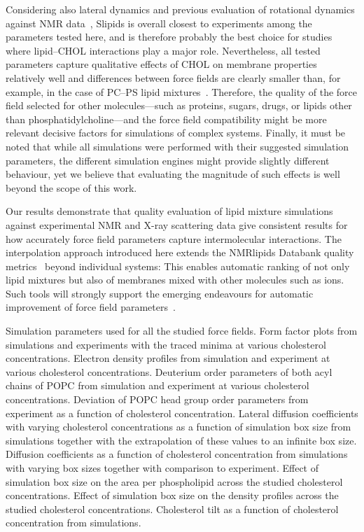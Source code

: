 \documentclass[journal=jctcce]{achemso}
\begin{document}
Considering also lateral dynamics and previous evaluation of rotational dynamics against NMR data~\cite{antila21using}, Slipids is overall closest to experiments among the parameters tested here, and is therefore probably the best choice for studies where lipid--CHOL interactions play a major role. Nevertheless, all tested parameters capture qualitative effects of CHOL on membrane properties relatively well and differences between force fields are clearly smaller than, for example, in the case of PC--PS lipid mixtures~\cite{antila2022emerging}. Therefore, the quality of the force field selected for other molecules---such as proteins, sugars, drugs, or lipids other than phosphatidylcholine---and the force field compatibility might be more relevant decisive factors for simulations of complex systems. Finally, it must be noted that while all simulations were performed with their suggested simulation parameters, the different simulation engines might provide slightly different behaviour, yet we believe that evaluating the magnitude of such effects is well beyond the scope of this work.

Our results demonstrate that quality evaluation of lipid mixture simulations against experimental NMR and X-ray scattering data give consistent results for how accurately force field parameters capture intermolecular interactions. The interpolation approach introduced here extends the NMRlipids Databank quality metrics~\cite{NMRlipidsDatabank} beyond individual systems: This enables automatic ranking of not only lipid mixtures but also of membranes mixed with other molecules such as ions. Such tools will strongly support the emerging endeavours for automatic improvement of force field parameters~\cite{antila2022emerging}.

\begin{suppinfo}
Simulation parameters used for all the studied force fields.
%
Form factor plots from simulations and experiments with the traced minima at various cholesterol concentrations.
%
Electron density profiles from simulation and experiment at various cholesterol concentrations.
%
Deuterium order parameters of both acyl chains of POPC from simulation and experiment at various cholesterol concentrations.
%
Deviation of POPC head group order parameters from experiment as a function of cholesterol concentration.
%
Lateral diffusion coefficients with varying cholesterol concentrations as a function of simulation box size from simulations together with the extrapolation of these values to an infinite box size.
%
Diffusion coefficients as a function of cholesterol concentration from simulations with varying box sizes together with comparison to experiment.
%
Effect of simulation box size on the area per phospholipid across the studied cholesterol concentrations.
%
Effect of simulation box size on the density profiles across the studied cholesterol concentrations.
%
Cholesterol tilt as a function of cholesterol concentration from simulations.
\end{suppinfo}
\end{document}
